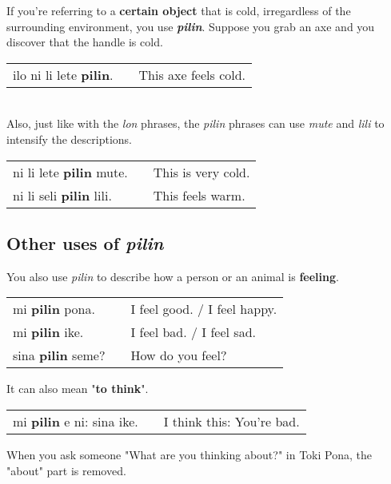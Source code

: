 If you're referring to a \textbf{certain object} that is cold, irregardless of the surrounding environment, you use \textbf{\textit{pilin}}.  
Suppose you grab an axe and you discover that the handle is cold. 

\begin{supertabular}{p{5,5cm}|ll}
ilo ni li lete \textbf{pilin}. && This axe feels cold. \\
\end{supertabular} \\

Also, just like with the \textit{lon} phrases, the \textit{pilin} phrases can use \textit{mute} and \textit{lili} to intensify the descriptions. 

\begin{supertabular}{p{5,5cm}|ll}
ni li lete \textbf{pilin} mute. && This is very cold. \\
ni li seli \textbf{pilin} lili. && This feels warm. \\
\end{supertabular} 
%
\subsection*{Other uses of \textit{pilin}}
%
You also use \textit{pilin} to describe how a person or an animal is \textbf{feeling}. 

\begin{supertabular}{p{5,5cm}|ll}
mi \textbf{pilin} pona. && I feel good. / I feel happy. \\
mi \textbf{pilin} ike. && I feel bad. / I feel sad. \\
sina \textbf{pilin} seme? && How do you feel? \\ 
\end{supertabular} 

It can also mean "\textbf{to think}".

\begin{supertabular}{p{5,5cm}|ll}
mi \textbf{pilin} e ni: sina ike. && I think this: You're bad. \\ 
\end{supertabular} 

When you ask someone "What are you thinking about?" in Toki Pona, the "about" part is removed. 

